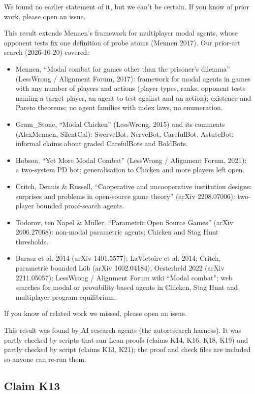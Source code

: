 \documentclass{article}
\begin{document}
We found no earlier statement of it, but we can't be certain. If you know of prior work, please open an issue.

This result extends Mennen's framework for multiplayer modal agents, whose opponent tests fix one definition of probe atoms (Mennen 2017). Our prior-art search (2026-10-20) covered:

\begin{itemize}
\item Mennen, ``Modal combat for games other than the prisoner's dilemma'' (LessWrong / Alignment Forum, 2017): framework for modal agents in games with any number of players and actions (player types, ranks, opponent tests naming a target player, an agent to test against and an action); existence and Pareto theorems; no agent families with index laws, no enumeration.
\item Gram\_Stone, ``Modal Chicken'' (LessWrong, 2015) and its comments (AlexMennen, SilentCal): SwerveBot, NerveBot, CarefulBot, AstuteBot; informal claims about graded CarefulBots and BoldBots.
\item Hobson, ``Yet More Modal Combat'' (LessWrong / Alignment Forum, 2021): a two-system PD bot; generalisation to Chicken and more players left open.
\item Critch, Dennis \& Russell, ``Cooperative and uncooperative institution designs: surprises and problems in open-source game theory'' (arXiv 2208.07006): two-player bounded proof-search agents.
\item Todorov, ten Napel \& Müller, ``Parametric Open Source Games'' (arXiv 2606.27068): non-modal parametric agents; Chicken and Stag Hunt thresholds.
\item Barasz et al. 2014 (arXiv 1401.5577); LaVictoire et al. 2014; Critch, parametric bounded Löb (arXiv 1602.04184); Oesterheld 2022 (arXiv 2211.05057); LessWrong / Alignment Forum wiki ``Modal combat''; web searches for modal or provability-based agents in Chicken, Stag Hunt and multiplayer program equilibrium.
\end{itemize}

If you know of related work we missed, please open an issue.

This result was found by AI research agents (the autoresearch harness). It was partly checked by scripts that run Lean proofs (claims K14, K16, K18, K19) and partly checked by script (claims K13, K21); the proof and check files are included so anyone can re-run them.

\subsection*{Claim K13}
\end{document}
